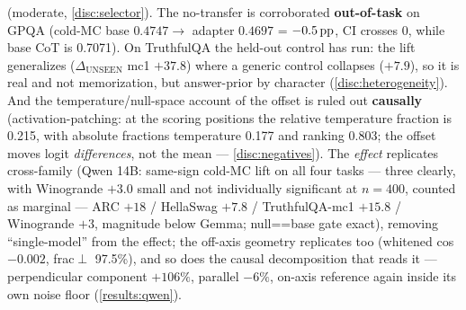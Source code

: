 (moderate, \cref{disc:selector}). The no-transfer is corroborated
\textbf{out-of-task} on GPQA (cold-MC base $0.4747 \rightarrow$ adapter $0.4697$ =
$-0.5\,\mathrm{pp}$, CI crosses 0, while base CoT is 0.7071). On TruthfulQA the held-out
control has run: the lift generalizes ($\Delta_{\mathrm{UNSEEN}}$ mc1 $+37.8$)
where a generic control collapses ($+7.9$), so it is real and not memorization, but
answer-prior by character (\cref{disc:heterogeneity}). And the temperature/null-space
account of the offset is ruled out \textbf{causally} (activation-patching: at the
scoring positions the relative temperature fraction is 0.215, with absolute
fractions temperature 0.177 and ranking 0.803; the offset moves logit
\emph{differences}, not the mean --- \cref{disc:negatives}). The \emph{effect}
replicates cross-family (Qwen 14B: same-sign cold-MC lift on all four tasks ---
three clearly, with Winogrande $+3.0$ small and not individually significant at
$n{=}400$, counted as marginal --- ARC $+18$ / HellaSwag $+7.8$ / TruthfulQA-mc1
$+15.8$ / Winogrande $+3$, magnitude below Gemma; null==base gate exact), removing
``single-model'' from the effect; the off-axis geometry replicates too (whitened
cos $-0.002$, frac${\perp}$ 97.5\%), and so does the causal decomposition that reads
it --- perpendicular component $+106\%$, parallel $-6\%$, on-axis reference again
inside its own noise floor (\cref{results:qwen}).

